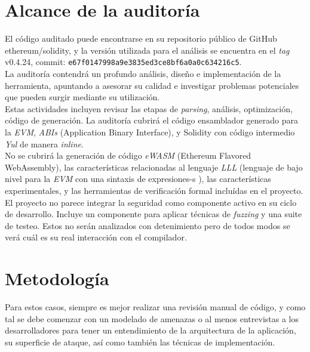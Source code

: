 \section{Alcance de la auditoría}

El código auditado puede encontrarse en su repositorio público de GitHub ethereum/solidity\cite{SolidityGitHub}, y la versión utilizada para el análisis se encuentra en el \textit{tag} v0.4.24\cite{SolidityGitHub0424}, commit: \texttt{e67f0147998a9e3835ed3ce8bf6a0a0c634216c5}.\\

La auditoría contendrá un profundo análisis, diseño e implementación de la herramienta, apuntando a asesorar su calidad e investigar problemas potenciales que pueden surgir mediante su utilización.\\

Estas actividades incluyen revisar las etapas de \textit{parsing}, análisis, optimización, código de generación. La auditoría cubrirá el código ensamblador generado para la \textit{EVM}, \textit{ABIs} (Application Binary Interface), y Solidity con código intermedio \textit{Yul} de manera \textit{inline}.\\

No se cubrirá la generación de código \textit{eWASM} (Ethereum Flavored WebAssembly), las características relacionadas al lenguaje \textit{LLL} (lenguaje de bajo nivel para la \textit{EVM} con una sintaxis de expresiones-s ), las características experimentales, y las herramientas de verificación formal incluídas en el proyecto.\\

El proyecto no parece integrar la seguridad como componente activo en su ciclo de desarrollo. Incluye un componente para aplicar técnicas de \textit{fuzzing} y una suite de testeo. Estos no serán analizados con detenimiento pero de todos modos se verá cuál es su real interacción con el compilador.

\section{Metodología }
\label{chap:metodo:metodologia}
Para estos casos, siempre es mejor realizar una revisión manual de código, y como tal se debe comenzar con un modelado de amenazas o al menos entrevistas a los desarrolladores para tener un entendimiento de la arquitectura de la aplicación, su superficie de ataque, así como también las técnicas de implementación.\\

